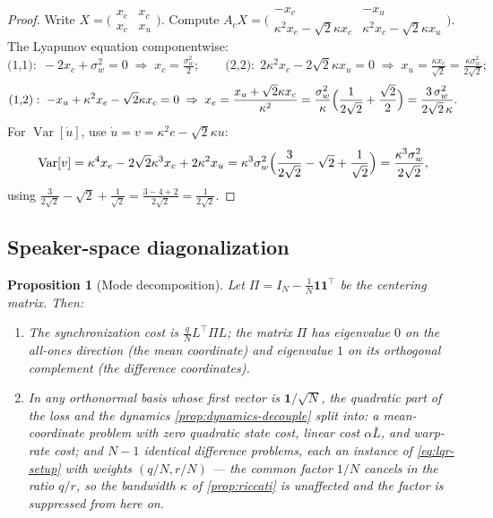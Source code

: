 \documentclass[11pt, a4paper]{article}
\theoremstyle{definition}
\theoremstyle{plain}
\newtheorem{proposition}[theorem]{Proposition}
\theoremstyle{remark}
\newcommand{\Var}{\operatorname{Var}}
\newcommand{\Lbar}{\bar{L}}
\begin{document}
\begin{proof}
Write $X = \bigl(\begin{smallmatrix} x_e&x_c\\ x_c&x_u
\end{smallmatrix}\bigr)$.  Compute
$A_c X = \bigl(\begin{smallmatrix} -x_c & -x_u\\
\kappa^2 x_e - \sqrt2\kappa x_c & \kappa^2 x_c - \sqrt2\kappa x_u
\end{smallmatrix}\bigr)$.
The Lyapunov equation componentwise:
\[
  \text{(1,1)}:\; -2x_c + \sigma_w^2 = 0
  \;\Rightarrow\; x_c = \tfrac{\sigma_w^2}{2};
  \qquad
  \text{(2,2)}:\; 2\kappa^2 x_c - 2\sqrt2\kappa x_u = 0
  \;\Rightarrow\; x_u = \tfrac{\kappa x_c}{\sqrt2}
   = \tfrac{\kappa\sigma_w^2}{2\sqrt2};
\]
\[
  \text{(1,2)}:\; -x_u + \kappa^2 x_e - \sqrt2\kappa x_c = 0
  \;\Rightarrow\;
  x_e = \frac{x_u + \sqrt2\kappa x_c}{\kappa^2}
      = \frac{\sigma_w^2}{\kappa}
        \Bigl(\frac{1}{2\sqrt2} + \frac{\sqrt2}{2}\Bigr)
      = \frac{3\,\sigma_w^2}{2\sqrt2\,\kappa}.
\]
For $\Var[\dot u]$, use $\dot u = v = \kappa^2 e - \sqrt2 \kappa u$:
\[
  \Var[v] = \kappa^4 x_e - 2\sqrt2\kappa^3 x_c + 2\kappa^2 x_u
  = \kappa^3\sigma_w^2\Bigl(\frac{3}{2\sqrt2} - \sqrt2
    + \frac{1}{\sqrt2}\Bigr)
  = \frac{\kappa^3\sigma_w^2}{2\sqrt2},
\]
using $\tfrac{3}{2\sqrt2} - \sqrt2 + \tfrac1{\sqrt2}
= \tfrac{3 - 4 + 2}{2\sqrt2} = \tfrac1{2\sqrt2}$.
\end{proof}

\subsection{Speaker-space diagonalization}\label{sec:speaker-modes}

\begin{proposition}[Mode decomposition]\label{prop:modes}
Let $\Pi = I_N - \tfrac1N \mathbf{1}\mathbf{1}^\top$ be the centering
matrix.  Then:
\begin{enumerate}[label=(\roman*)]
  \item The synchronization cost is
    $\tfrac{q}{N} L^\top \Pi L$; the matrix $\Pi$ has eigenvalue $0$ on
    the all-ones direction (the mean coordinate) and eigenvalue $1$ on
    its orthogonal complement (the difference coordinates).
  \item In any orthonormal basis whose first vector is
    $\mathbf{1}/\sqrt N$, the quadratic part of the loss and the
    dynamics \cref{prop:dynamics-decouple} split into: a mean-coordinate
    problem with \emph{zero} quadratic state cost, linear cost
    $\alpha\Lbar$, and warp-rate cost; and $N-1$ identical difference
    problems, each an instance of \cref{eq:lqr-setup} with weights
    $(q/N, r/N)$ --- the common factor $1/N$ cancels in the ratio
    $q/r$, so the bandwidth $\kappa$ of \cref{prop:riccati} is
    unaffected and the factor is suppressed from here on.
\end{enumerate}
\end{proposition}
\end{document}
